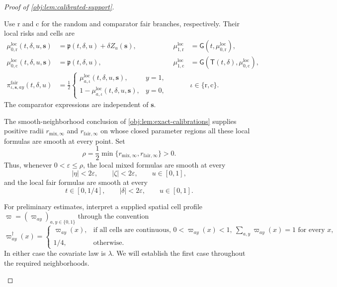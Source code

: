\documentclass[11pt]{article}
\begin{document}
\begin{proof}[Proof of \cref{obj:lem:calibrated-support}]
\begin{enumerate}
Use \(\mathrm r\) and \(\mathrm c\) for the random and comparator fair branches, respectively. Their local risks and cells are
\[
\begin{aligned}
\mu^{\mathrm{loc}}_{0,\mathrm r}(t,\delta,u,\mathbf s)
&=\mathfrak p(t,\delta,u)+\delta Z_u(\mathbf s),&
\mu^{\mathrm{loc}}_{1,\mathrm r}
&=\mathsf G(t,\mu^{\mathrm{loc}}_{0,\mathrm r}),\\
\mu^{\mathrm{loc}}_{0,\mathrm c}(t,\delta,u,\mathbf s)
&=\mathfrak p(t,\delta,u),&
\mu^{\mathrm{loc}}_{1,\mathrm c}
&=\mathsf G(\mathsf T(t,\delta),\mu^{\mathrm{loc}}_{0,\mathrm c}),\\
\pi^{\mathrm{fair}}_{\iota,\mathbf s,ay}(t,\delta,u)
&=\frac12
\begin{cases}
\mu^{\mathrm{loc}}_{a,\iota}(t,\delta,u,\mathbf s),&y=1,\\
1-\mu^{\mathrm{loc}}_{a,\iota}(t,\delta,u,\mathbf s),&y=0,
\end{cases}
&&\iota\in\{\mathrm r,\mathrm c\}.
\end{aligned}
\]
The comparator expressions are independent of \(\mathbf s\).

The smooth-neighborhood conclusion of
\cref{obj:lem:exact-calibrations} supplies positive radii
\(r_{\mathrm{mix},\infty}\) and \(r_{\mathrm{fair},\infty}\) on whose closed parameter regions all these local formulas are smooth at every point. Set
\[
\rho=\frac12\min\{r_{\mathrm{mix},\infty},
                         r_{\mathrm{fair},\infty}\}>0.
\]
Thus, whenever \(0<\varepsilon\le\rho\), the local mixed formulas are smooth at every
\[
|\eta|<2\varepsilon,\qquad |\zeta|<2\varepsilon,\qquad u\in[0,1],
\]
and the local fair formulas are smooth at every
\[
t\in[0,1/4],\qquad |\delta|<2\varepsilon,\qquad u\in[0,1].
\]

For preliminary estimates, interpret a supplied spatial cell profile
\(\varpi=(\varpi_{ay})_{a,y\in\{0,1\}}\) through the convention
\[
\varpi^\dagger_{ay}(x)=
\begin{cases}
\varpi_{ay}(x),
&\text{if all cells are continuous, }
  0<\varpi_{ay}(x)<1,\ \sum_{a,y}\varpi_{ay}(x)=1
  \text{ for every }x,\\
1/4,&\text{otherwise}.
\end{cases}
\]
In either case the covariate law is \(\lambda\).
We will establish the first case throughout the required neighborhoods.


\end{enumerate}
\end{proof}
\end{document}
